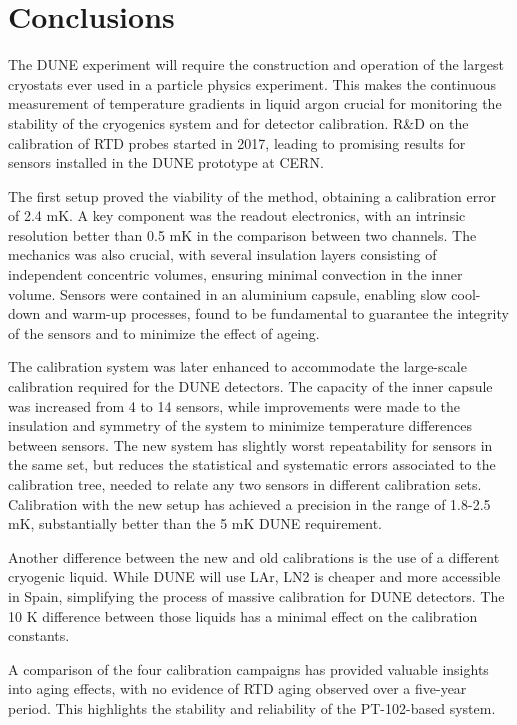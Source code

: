 \section{Conclusions}
\label{conclusions}

The DUNE experiment will require the construction and operation of the largest cryostats ever used in a particle physics experiment. This makes the continuous measurement of temperature gradients in liquid argon crucial for monitoring the stability of the cryogenics system and for detector calibration. R\&D on the calibration of RTD probes started in 2017, leading to promising results for sensors installed in the DUNE prototype at CERN. 

The first setup proved the viability of the method, obtaining a calibration error of 2.4 mK. A key component was the readout electronics, with an intrinsic resolution better than 0.5 mK in the comparison between two channels. The mechanics was also crucial, with several insulation layers consisting of independent concentric volumes, ensuring minimal convection in the inner volume. Sensors were contained in an aluminium capsule, enabling slow cool-down and warm-up processes, found to be fundamental to guarantee the integrity of the sensors and to minimize the effect of ageing. 

The calibration system was later enhanced to accommodate the large-scale calibration required for the DUNE detectors. The capacity of the inner capsule was increased from 4 to 14 sensors, while improvements were made to the insulation and symmetry of the system to minimize temperature differences between sensors. The new system has slightly worst repeatability for sensors in the same set, but reduces the statistical and systematic errors associated to the calibration tree, needed to relate any two sensors in different calibration sets. Calibration with the new setup has achieved a precision in the range of 1.8-2.5 mK, substantially better than the 5 mK DUNE requirement.  

Another difference between the new and old calibrations is the use of a different cryogenic liquid. While DUNE will use LAr, LN2 is cheaper and more accessible in Spain, simplifying the process of massive calibration for DUNE detectors. The 10 K difference between those liquids has a minimal effect on the calibration constants. 

A comparison of the four calibration campaigns has provided valuable insights into aging effects, with no evidence of RTD aging observed over a five-year period. This highlights the stability and reliability of the PT-102-based system.